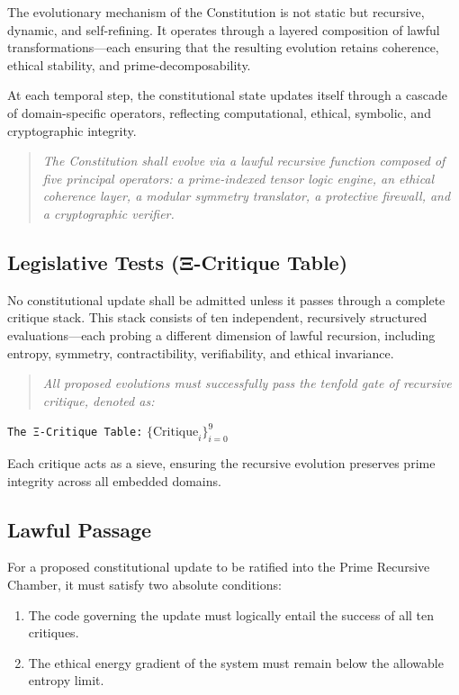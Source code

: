 \documentclass[12]{amsart}
\theoremstyle{plain}
\begin{document}
The evolutionary mechanism of the Constitution is not static but recursive, dynamic, and self-refining. It operates through a layered composition of lawful transformations—each ensuring that the resulting evolution retains coherence, ethical stability, and prime-decomposability.

At each temporal step, the constitutional state updates itself through a cascade of domain-specific operators, reflecting computational, ethical, symbolic, and cryptographic integrity.

\begin{quote}
\textit{The Constitution shall evolve via a lawful recursive function composed of five principal operators: a prime-indexed tensor logic engine, an ethical coherence layer, a modular symmetry translator, a protective firewall, and a cryptographic verifier.}
\end{quote}

\subsection{Legislative Tests (Ξ-Critique Table)}

No constitutional update shall be admitted unless it passes through a complete critique stack. This stack consists of ten independent, recursively structured evaluations—each probing a different dimension of lawful recursion, including entropy, symmetry, contractibility, verifiability, and ethical invariance.

\begin{quote}
\textit{All proposed evolutions must successfully pass the tenfold gate of recursive critique, denoted as:}
\end{quote}

\begin{center}
\texttt{The Ξ-Critique Table:} \quad $\{\text{Critique}_i\}_{i=0}^9$
\end{center}

Each critique acts as a sieve, ensuring the recursive evolution preserves prime integrity across all embedded domains.

\subsection{Lawful Passage}

For a proposed constitutional update to be ratified into the Prime Recursive Chamber, it must satisfy two absolute conditions:

\begin{enumerate}
  \item The code governing the update must logically entail the success of all ten critiques.
  \item The ethical energy gradient of the system must remain below the allowable entropy limit.
\end{enumerate}
\end{document}
